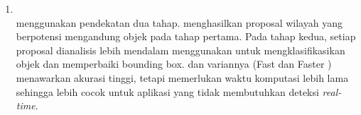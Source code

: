 \begin{enumerate}
\begin{enumerate}
		      \item \rcnn~\\
		            \rcnn{} menggunakan pendekatan dua tahap. \rcnn{} menghasilkan proposal wilayah yang berpotensi mengandung objek pada tahap pertama. Pada tahap kedua, setiap proposal dianalisis lebih mendalam menggunakan \cnn{} untuk mengklasifikasikan objek dan memperbaiki bounding box. \rcnn{} dan variannya (Fast \rcnn{} dan Faster \rcnn{}) menawarkan akurasi tinggi, tetapi memerlukan waktu komputasi lebih lama sehingga lebih cocok untuk aplikasi yang tidak membutuhkan deteksi \emph{real-time}. \parencite{xie2021oriented}
	      \end{enumerate}
\end{enumerate}